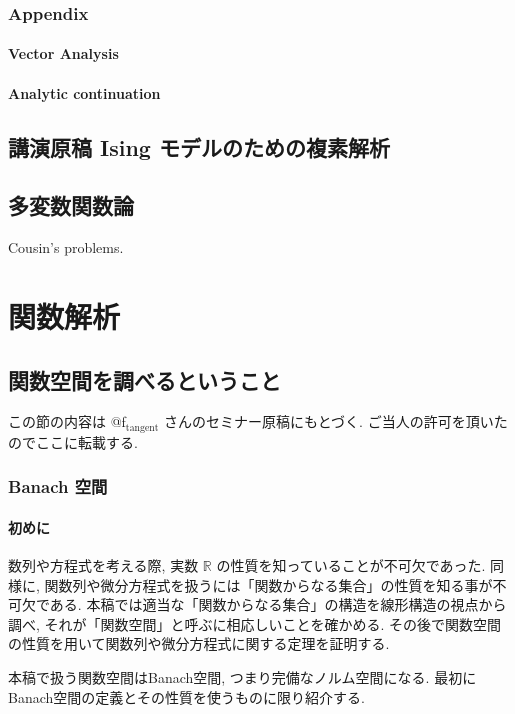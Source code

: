 \documentclass[openany, a4paper, oneside]{jsbook}
\begin{document}
\section{Appendix}

\subsection{Vector Analysis}

\subsection{Analytic continuation}

\chapter{講演原稿 Ising モデルのための複素解析}

\chapter{多変数関数論}

Cousin's problems.
\part{関数解析}

\chapter{関数空間を調べるということ}

この節の内容は @f$_{\text{tangent}}$ さんのセミナー原稿にもとづく.
ご当人の許可を頂いたのでここに転載する.
\section{Banach 空間}

\subsection{初めに}

数列や方程式を考える際, 実数 $\mathbb{R}$ の性質を知っていることが不可欠であった.
同様に, 関数列や微分方程式を扱うには「関数からなる集合」の性質を知る事が不可欠である.
本稿では適当な「関数からなる集合」の構造を線形構造の視点から調べ, それが「関数空間」と呼ぶに相応しいことを確かめる.
その後で関数空間の性質を用いて関数列や微分方程式に関する定理を証明する.

本稿で扱う関数空間はBanach空間, つまり完備なノルム空間になる.
最初にBanach空間の定義とその性質を使うものに限り紹介する.
\end{document}
